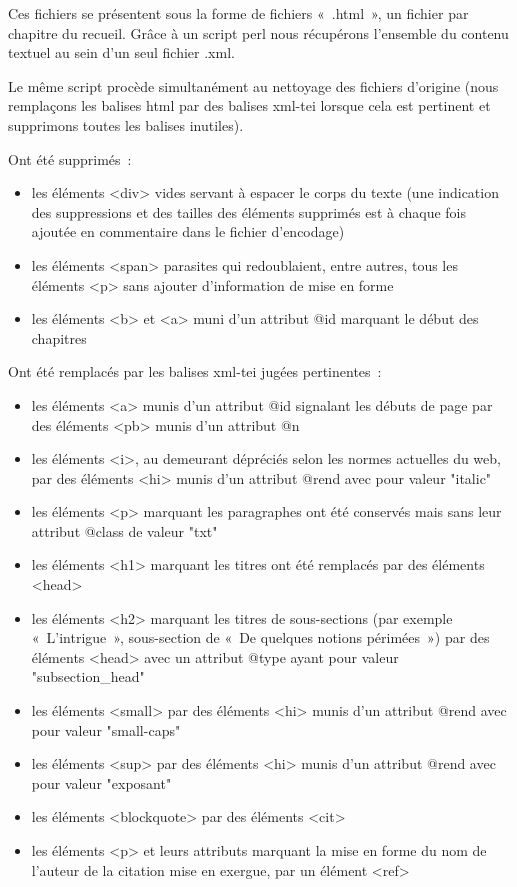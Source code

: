 Ces fichiers se présentent sous la forme de fichiers «~.html~», un fichier par chapitre du recueil. Grâce à un script perl nous récupérons l'ensemble du contenu textuel au sein d'un seul fichier .xml.

Le même script procède simultanément au nettoyage des fichiers d'origine (nous remplaçons les balises html par des balises xml-tei lorsque cela est pertinent et supprimons toutes les balises inutiles).

Ont été supprimés~:
\begin{itemize}
    \item les éléments <div> vides servant à espacer le corps du texte (une indication des suppressions et des tailles des éléments supprimés est à chaque fois ajoutée en commentaire dans le fichier d'encodage)
    \item les éléments <span> parasites qui redoublaient, entre autres, tous les éléments <p> sans ajouter d'information de mise en forme
    \item les éléments <b> et <a> muni d'un attribut @id marquant le début des chapitres
\end{itemize}

Ont été remplacés par les balises xml-tei jugées pertinentes~:
\begin{itemize}
    \item les éléments <a> munis d'un attribut @id signalant les débuts de page par des éléments <pb> munis d'un attribut @n
    \item les éléments <i>, au demeurant dépréciés selon les normes actuelles du web, par des éléments <hi> munis d'un attribut @rend avec pour valeur "italic"
    \item les éléments <p> marquant les paragraphes ont été conservés mais sans leur attribut @class de valeur "txt"
    \item les éléments <h1> marquant les titres ont été remplacés par des éléments <head>
    \item les éléments <h2> marquant les titres de sous-sections (par exemple «~L'intrigue~», sous-section de «~De quelques notions périmées~») par des éléments <head> avec un attribut @type ayant pour valeur "subsection\_head"
    \item les éléments <small> par des éléments <hi> munis d'un attribut @rend avec pour valeur "small-caps"
    \item les éléments <sup> par des éléments <hi> munis d'un attribut @rend avec pour valeur "exposant"
    \item les éléments <blockquote> par des éléments <cit>
    \item les éléments <p> et leurs attributs marquant la mise en forme du nom de l'auteur de la citation mise en exergue, par un élément <ref>
\end{itemize}

